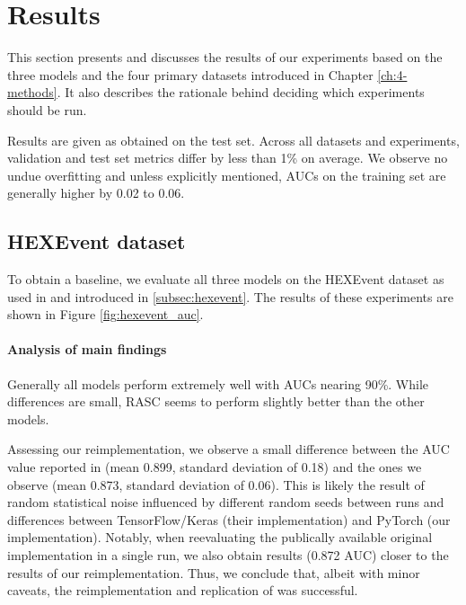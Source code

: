 \chapter{\label{ch:ch5-results}Results}
This section presents and discusses the results of our experiments based on the three models and the four primary datasets introduced in Chapter \ref{ch:4-methods}. It also describes the rationale behind deciding which experiments should be run.

Results are given as obtained on the test set. Across all datasets and experiments, validation and test set metrics differ by less than 1\% on average. We observe no undue overfitting and unless explicitly mentioned, AUCs on the training set are generally higher by 0.02 to 0.06. 
\section{HEXEvent dataset} \label{sec:hexevent_results}
To obtain a baseline, we evaluate all three models on the HEXEvent dataset as used in \cite{dsc} and introduced in \ref{subsec:hexevent}. The results of these experiments are shown in Figure \ref{fig:hexevent_auc}.

\subsubsection{Analysis of main findings}
Generally all models perform extremely well with AUCs nearing 90\%. While differences are small, RASC seems to perform slightly better than the other models.

Assessing our reimplementation, we observe a small difference between the AUC value reported in \cite{dsc} (mean 0.899, standard deviation of 0.18) and the ones we observe (mean 0.873, standard deviation of 0.06). This is likely the result of random statistical noise influenced by different random seeds between runs and differences between TensorFlow/Keras (their implementation) and PyTorch (our implementation). Notably, when reevaluating the publically available original implementation in a single run, we also obtain results (0.872 AUC) closer to the results of our reimplementation. 
Thus, we conclude that, albeit with minor caveats, the reimplementation and replication of \cite{dsc} was successful.

